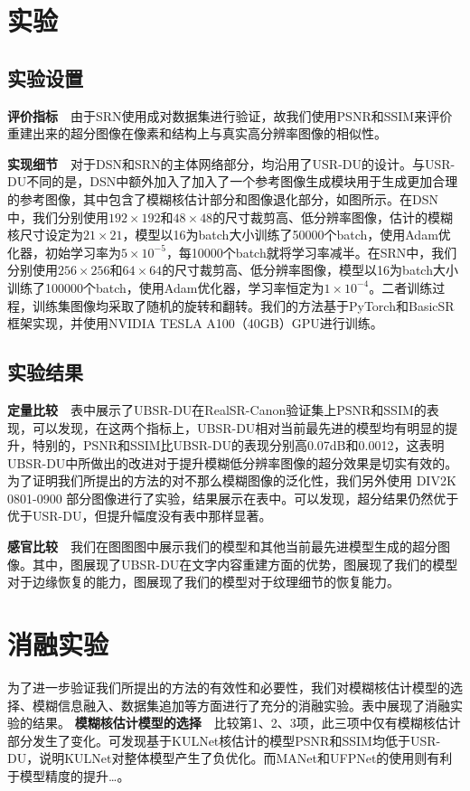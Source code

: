 \section{实验}
\subsection{实验设置}
\noindent\textbf{评价指标}\ \ 由于SRN使用成对数据集进行验证，故我们使用PSNR和SSIM来评价重建出来的超分图像在像素和结构上与真实高分辨率图像的相似性。

\noindent\textbf{实现细节}\ \ 对于DSN和SRN的主体网络部分，均沿用了USR-DU的设计。与USR-DU不同的是，DSN中额外加入了加入了一个参考图像生成模块用于生成更加合理的参考图像，其中包含了模糊核估计部分和图像退化部分，如图所示。在DSN中，我们分别使用$192\times192$和$48\times48$的尺寸裁剪高、低分辨率图像，估计的模糊核尺寸设定为$21\times21$，模型以16为batch大小训练了50000个batch，使用Adam优化器，初始学习率为$5\times10^{-5}$，每10000个batch就将学习率减半。在SRN中，我们分别使用$256\times256$和$64\times64$的尺寸裁剪高、低分辨率图像，模型以16为batch大小训练了100000个batch，使用Adam优化器，学习率恒定为$1\times10^{-4}$。二者训练过程，训练集图像均采取了随机的旋转和翻转。我们的方法基于PyTorch和BasicSR框架实现，并使用NVIDIA TESLA A100（40GB）GPU进行训练。
\subsection{实验结果}
\noindent\textbf{定量比较}\ \ 表中展示了UBSR-DU在RealSR-Canon验证集上PSNR和SSIM的表现，可以发现，在这两个指标上，UBSR-DU相对当前最先进的模型均有明显的提升，特别的，PSNR和SSIM比UBSR-DU的表现分别高0.07dB和0.0012，这表明UBSR-DU中所做出的改进对于提升模糊低分辨率图像的超分效果是切实有效的。为了证明我们所提出的方法的对不那么模糊图像的泛化性，我们另外使用 DIV2K 0801-0900 部分图像进行了实验，结果展示在表中。可以发现，超分结果仍然优于优于USR-DU，但提升幅度没有表中那样显著。

\noindent\textbf{感官比较}\ \ 我们在图图图中展示我们的模型和其他当前最先进模型生成的超分图像。其中，图展现了UBSR-DU在文字内容重建方面的优势，图展现了我们的模型对于边缘恢复的能力，图展现了我们的模型对于纹理细节的恢复能力。
\section{消融实验}
为了进一步验证我们所提出的方法的有效性和必要性，我们对模糊核估计模型的选择、模糊信息融入、数据集追加等方面进行了充分的消融实验。表中展现了消融实验的结果。
\noindent\textbf{模糊核估计模型的选择}\ \ 比较第1、2、3项，此三项中仅有模糊核估计部分发生了变化。可发现基于KULNet核估计的模型PSNR和SSIM均低于USR-DU，说明KULNet对整体模型产生了负优化。而MANet和UFPNet的使用则有利于模型精度的提升\dots。

